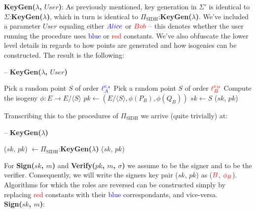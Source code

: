 \noindent
\textbf{KeyGen($\lambda$, $User$)}: As previously mentioned, key generation in $\Sigma'$ is identical to $\Sigma$:\textbf{KeyGen($\lambda$)}, which in turn is identical to $\Pi_{\text{SIDH}}$:\textbf{KeyGen($\lambda$)}. We've included a parameter $User$ equaling either $\textcolor{blue}{Alice}$ or $\textcolor{red}{Bob}$ -- this denotes whether the user running the procedure uses \textcolor{blue}{blue} or \textcolor{red}{red} constants. We've also obfuscate the lower level details in regards to how points are generated and how isogenies can be constructed. The result is the following:

\begin{algorithm}
\caption{-- \textbf{KeyGen($\lambda$, $User$)}}\label{euclid}
\begin{algorithmic}[1]
	\State Pick a random point $S$ of order $\textcolor{blue}{\ell_{A}^{e_A}}$
\EndIf
{}
	\State Pick a random point $S$ of order $\textcolor{red}{\ell_{B}^{e_B}}$
\EndIf
\State Compute the isogeny $\phi: E \rightarrow E/\langle S \rangle$
\State $pk \gets (E/\langle S \rangle, \phi(P_{B}), \phi(Q_{B}))$
\State $sk \gets S$
\State \Return ($sk$, $pk$)
\end{algorithmic}
\end{algorithm}

\noindent
Transcribing this to the procedures of $\Pi_{\text{SIDH}}$ we arrive (quite trivially) at:

\begin{algorithm}
\caption{-- \textbf{KeyGen($\lambda$)}}\label{euclid}
\begin{algorithmic}[1]
\State ($sk$, $pk$) $\gets \Pi_{\text{SIDH}}$:\textbf{KeyGen($\lambda$)}
\State \Return ($sk$, $pk$)
\end{algorithmic}
\end{algorithm}

For \textbf{Sign($sk$, $m$)} and \textbf{Verify($pk$, $m$, $\sigma$)} we assume \bob to be the signer and \alice to be the verifier. Consequently, we will write the signers key pair ($sk$, $pk$) as ($\textcolor{red}{B}$, $\textcolor{red}{\phi_B}$). Algorithms for which the roles are reversed can be constructed simply by replacing \textcolor{red}{red} constants with their \textcolor{blue}{blue} correspondants, and vice-versa.\\  

\noindent
\textbf{Sign($sk$, $m$)}: \\


